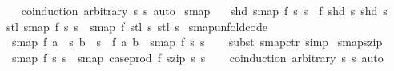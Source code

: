 \begin{isabellebody}
%
\isadelimproof
\ \ %
\endisadelimproof
%
\isatagproof
{}\isamarkupfalse%
\ {\isacharparenleft}coinduction\ arbitrary{\isacharcolon}\ s{}\ s{}{\isacharparenright}\ auto%
\endisatagproof
{\isafoldproof}%
%
\isadelimproof
%
\endisadelimproof
%
\isadelimdocument
%
\endisadelimdocument
%
\isatagdocument
%
\isamarkuptrue%
%
\endisatagdocument
{\isafolddocument}%
%
\isadelimdocument
%
\endisadelimdocument
{}\isamarkupfalse%
\ smap{}\ \isanewline
\ \ {\isachardoublequoteopen}shd\ {\isacharparenleft}smap{}\ f\ s{}\ s{}{\isacharparenright}\ {\isacharequal}\ f\ {\isacharparenleft}shd\ s{}{\isacharparenright}\ {\isacharparenleft}shd\ s{}{\isacharparenright}{\isachardoublequoteclose}\isanewline
{\isacharbar}\ {\isachardoublequoteopen}stl\ {\isacharparenleft}smap{}\ f\ s{}\ s{}{\isacharparenright}\ {\isacharequal}\ smap{}\ f\ {\isacharparenleft}stl\ s{}{\isacharparenright}\ {\isacharparenleft}stl\ s{}{\isacharparenright}{\isachardoublequoteclose}\isanewline
\isanewline
{}\isamarkupfalse%
\ smap{}{\isacharunderscore}unfold{\isacharbrackleft}code{\isacharbrackright}{\isacharcolon}\isanewline
\ \ {\isachardoublequoteopen}smap{}\ f\ {\isacharparenleft}a\ {\isacharhash}{\isacharhash}\ s{}{\isacharparenright}\ {\isacharparenleft}b\ {\isacharhash}{\isacharhash}\ s{}{\isacharparenright}\ {\isacharequal}\ f\ a\ b\ {\isacharhash}{\isacharhash}\ {\isacharparenleft}smap{}\ f\ s{}\ s{}{\isacharparenright}{\isachardoublequoteclose}\isanewline
%
\isadelimproof
\ \ %
\endisadelimproof
%
\isatagproof
{}\isamarkupfalse%
\ {\isacharparenleft}subst\ smap{}{\isachardot}ctr{\isacharparenright}\ simp%
\endisatagproof
{\isafoldproof}%
%
\isadelimproof
\isanewline
%
\endisadelimproof
\isanewline
{}\isamarkupfalse%
\ smap{}{\isacharunderscore}szip{\isacharcolon}\isanewline
\ \ {\isachardoublequoteopen}smap{}\ f\ s{}\ s{}\ {\isacharequal}\ smap\ {\isacharparenleft}case{\isacharunderscore}prod\ f{\isacharparenright}\ {\isacharparenleft}szip\ s{}\ s{}{\isacharparenright}{\isachardoublequoteclose}\isanewline
%
\isadelimproof
\ \ %
\endisadelimproof
%
\isatagproof
{}\isamarkupfalse%
\ {\isacharparenleft}coinduction\ arbitrary{\isacharcolon}\ s{}\ s{}{\isacharparenright}\ auto%

\end{isabellebody}
